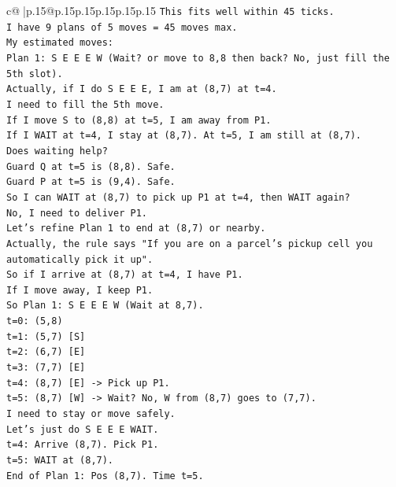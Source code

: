 \documentclass{article}
\begin{document}
{\begin{supertabular}{c@{$\;$}|p{.15\linewidth}@{}p{.15\linewidth}p{.15\linewidth}p{.15\linewidth}p{.15\linewidth}p{.15\linewidth}}
{{{\texttt{This fits well within 45 ticks.} \\
\texttt{I have 9 plans of 5 moves = 45 moves max.} \\
\texttt{My estimated moves:} \\
\texttt{Plan 1: S E E E W (Wait? or move to 8,8 then back? No, just fill the 5th slot).} \\
\texttt{Actually, if I do S E E E, I am at (8,7) at t=4.} \\
\texttt{I need to fill the 5th move.} \\
\texttt{If I move S to (8,8) at t=5, I am away from P1.} \\
\texttt{If I WAIT at t=4, I stay at (8,7). At t=5, I am still at (8,7).} \\
\texttt{Does waiting help?} \\
\texttt{Guard Q at t=5 is (8,8). Safe.} \\
\texttt{Guard P at t=5 is (9,4). Safe.} \\
\texttt{So I can WAIT at (8,7) to pick up P1 at t=4, then WAIT again?} \\
\texttt{No, I need to deliver P1.} \\
\texttt{Let's refine Plan 1 to end at (8,7) or nearby.} \\
\texttt{Actually, the rule says "If you are on a parcel's pickup cell you automatically pick it up".} \\
\texttt{So if I arrive at (8,7) at t=4, I have P1.} \\
\texttt{If I move away, I keep P1.} \\
\texttt{So Plan 1: S E E E W (Wait at 8,7).} \\
\texttt{t=0: (5,8)} \\
\texttt{t=1: (5,7) {[}S{]}} \\
\texttt{t=2: (6,7) {[}E{]}} \\
\texttt{t=3: (7,7) {[}E{]}} \\
\texttt{t=4: (8,7) {[}E{]} {-}> Pick up P1.} \\
\texttt{t=5: (8,7) {[}W{]} {-}> Wait? No, W from (8,7) goes to (7,7).} \\
\texttt{I need to stay or move safely.} \\
\texttt{Let's just do S E E E WAIT.} \\
\texttt{t=4: Arrive (8,7). Pick P1.} \\
\texttt{t=5: WAIT at (8,7).} \\
\texttt{End of Plan 1: Pos (8,7). Time t=5.} \\
\\ 
}}}
\end{supertabular}}
\end{document}
